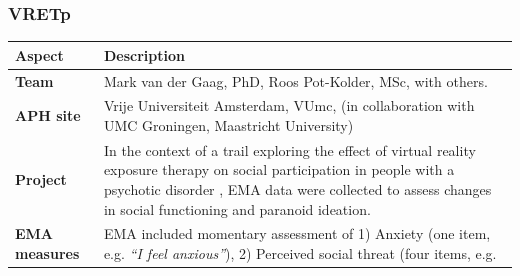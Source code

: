 \documentclass[]{book}
\begin{document}
\subsubsection{VRETp}\label{vretp}

 

\begin{longtable}[]{@{}ll@{}}
\toprule
\begin{minipage}[b]{0.25\columnwidth}\raggedright\strut
\textbf{Aspect}\strut
\end{minipage} & \begin{minipage}[b]{0.69\columnwidth}\raggedright\strut
\textbf{Description}\strut
\end{minipage}\tabularnewline
\midrule
\endhead
\begin{minipage}[t]{0.25\columnwidth}\raggedright\strut
\textbf{Team}\strut
\end{minipage} & \begin{minipage}[t]{0.69\columnwidth}\raggedright\strut
Mark van der Gaag, PhD, Roos Pot-Kolder, MSc, with others.\strut
\end{minipage}\tabularnewline
\begin{minipage}[t]{0.25\columnwidth}\raggedright\strut
\textbf{APH site}\strut
\end{minipage} & \begin{minipage}[t]{0.69\columnwidth}\raggedright\strut
Vrije Universiteit Amsterdam, VUmc, (in collaboration with UMC
Groningen, Maastricht University)\strut
\end{minipage}\tabularnewline
\begin{minipage}[t]{0.25\columnwidth}\raggedright\strut
\textbf{Project}\strut
\end{minipage} & \begin{minipage}[t]{0.69\columnwidth}\raggedright\strut
In the context of a trail exploring the effect of virtual reality
exposure therapy on social participation in people with a psychotic
disorder \citep[VRETp; n = 116,][]{pot2016}, EMA data were collected to
assess changes in social functioning and paranoid ideation.\strut
\end{minipage}\tabularnewline
\begin{minipage}[t]{0.25\columnwidth}\raggedright\strut
\textbf{EMA measures}\strut
\end{minipage} & \begin{minipage}[t]{0.69\columnwidth}\raggedright\strut
EMA included momentary assessment of 1) Anxiety (one item, e.g.
\emph{``I feel anxious''}), 2) Perceived social threat (four items, e.g.

\end{minipage}
\end{longtable}
\end{document}
